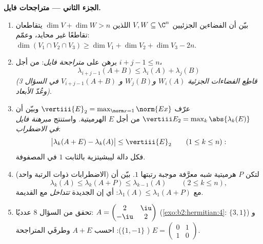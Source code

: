 \begin{problem}
\medskip
\noindent\textbf{الجزء الثاني --- متراجحات فايل.}
\begin{enumerate}[resume]
  \item بيّن أن الفضاءين الجزئيين $V, W \subseteq \C^n$ اللذين $\dim V
        + \dim W > n$ يتقاطعان تقاطعًا غير محايد، وعمّم:
        $\dim(V_1 \cap V_2 \cap V_3) \geq \dim V_1 + \dim V_2 +
        \dim V_3 - 2n$.
  \item برهن على \emph{متراجحة فايل}: من أجل $i + j - 1 \leq n$،
        \[
        \lambda_{i+j-1}(A + B) \leq \lambda_i(A) +
        \lambda_j(B)
        \]
        \emph{(قاطِع الفضاءات الجزئية $W_i(A)$ و$W_j(B)$ و
        $V_{i+j-1}(A+B)$ في السؤال 3 وعُدّ
        الأبعاد)}.
  \item عرّف $\vertiii{E}_2 = \max_{\norm x = 1}\norm{Ex}$
        وبيّن أن $\vertiii E_2 = \max_k\abs{\lambda_k(E)}$ من أجل
        $E$ الهرميتية. واستنتج \emph{مبرهنة فايل في
        الاضطراب}:
        \[
        \bigl|\lambda_k(A + E) - \lambda_k(A)\bigr| \leq
        \vertiii{E}_2
        \qquad (1 \leq k \leq n) :
        \]
        فكل  دالة ليبشيتزية بالثابت $1$ في
        المصفوفة.
  \item (الاضطرابات ذوات الرتبة واحد) لتكن $P$ هرميتية شبه
        معرَّفة موجبة رتبتها $1$. بيّن أن
        \[
        \lambda_k(A) \leq \lambda_k(A + P) \leq
        \lambda_{k-1}(A) \qquad (2 \leq k \leq n),
        \]
        مع $\lambda_1(A) \leq \lambda_1(A+P)$: أي إن
         الجديدة \emph{تتداخل} مع القديمة.
  \item تحقق من السؤال 8 عدديًا: $A = \begin{pmatrix} 2 &
        \iu\\ -\iu & 2\end{pmatrix}$
        (\cref{exo:b2:hermitian:4}:  $\{3, 1\}$) و
        $E = \begin{pmatrix} 0 & 1\\ 1 & 0\end{pmatrix}$
        ( $\{1, -1\}$): احسب  $A +
        E$ وطرفَي المتراجحة.
\end{enumerate}


\end{problem}
